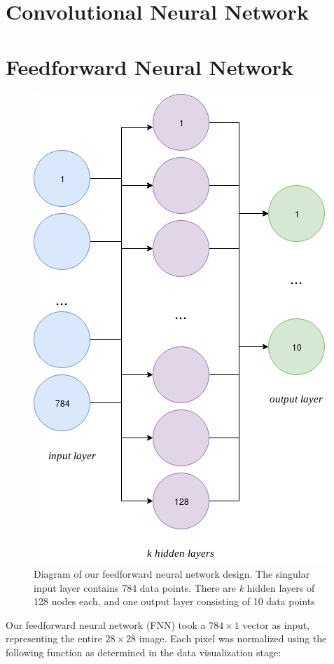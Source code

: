 \documentclass[conference]{IEEEtran}
\begin{document}
\section{Convolutional Neural Network}

\section{Feedforward Neural Network}

\begin{figure}[h!] 
\centering
  \includegraphics[scale=.33]{fNN.png}
  \caption{Diagram of our feedforward neural network design. The singular input layer
  contains 784 data points. There are \textit{k} hidden layers of 128 nodes each, and one output layer consisting of 10 data points}
  \label{fig:fnn_dia}
\end{figure}

Our feedforward neural network (FNN) took a $784 \times 1$ vector as input, representing the entire $28 \times 28$ image. Each pixel was normalized using the following function as determined in the data visualization stage:
\end{document}
